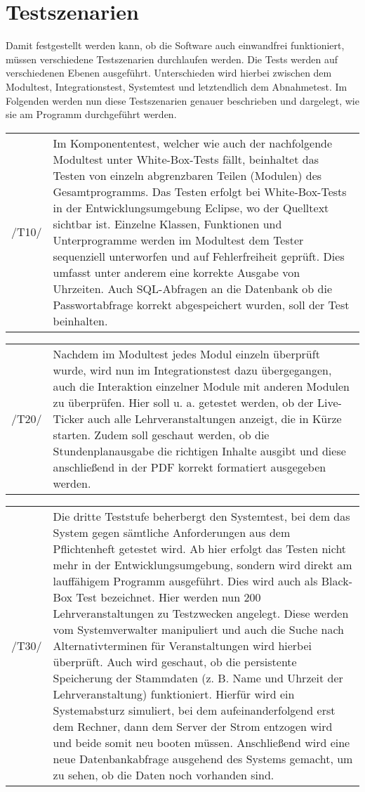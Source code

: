\section{Testszenarien}
\label{sec:Testszenarien}


Damit festgestellt werden kann, ob die Software auch einwandfrei funktioniert, müssen verschiedene Testszenarien durchlaufen werden.
Die Tests werden auf verschiedenen Ebenen ausgeführt. Unterschieden wird hierbei zwischen dem Modultest, Integrationstest, Systemtest und letztendlich dem Abnahmetest.
Im Folgenden werden nun diese Testszenarien genauer beschrieben und dargelegt, wie sie am Programm durchgeführt werden.

\begin{tabular}{p{1.5cm}p{14.5cm}}
 /T10/	& Im Komponententest, welcher wie auch der nachfolgende Modultest unter White-Box-Tests fällt, beinhaltet das Testen von einzeln abgrenzbaren Teilen (Modulen) des Gesamtprogramms. Das Testen erfolgt bei White-Box-Tests in der Entwicklungsumgebung Eclipse, wo der Quelltext sichtbar ist. Einzelne Klassen, Funktionen und Unterprogramme werden im Modultest dem Tester sequenziell unterworfen und auf Fehlerfreiheit geprüft. Dies umfasst unter anderem eine korrekte Ausgabe von Uhrzeiten. Auch SQL-Abfragen an die Datenbank ob die Passwortabfrage korrekt abgespeichert wurden, soll der Test beinhalten. \\[0.25cm]	 
\end{tabular}

\begin{tabular}{p{1.5cm}p{14.5cm}}
 /T20/	& Nachdem im Modultest jedes Modul einzeln überprüft wurde, wird nun im Integrationstest dazu übergegangen, auch die Interaktion einzelner Module mit anderen Modulen zu überprüfen.
Hier soll u. a. getestet werden, ob der Live-Ticker auch alle Lehrveranstaltungen anzeigt, die in Kürze starten. Zudem soll geschaut werden, ob die Stundenplanausgabe die richtigen Inhalte ausgibt und diese anschließend in der PDF korrekt formatiert ausgegeben werden. \\[0.25cm]	 
\end{tabular}

\begin{tabular}{p{1.5cm}p{14.5cm}}
 /T30/	& Die dritte Teststufe beherbergt den Systemtest, bei dem das System gegen sämtliche Anforderungen aus dem Pflichtenheft getestet wird. Ab hier erfolgt das Testen nicht mehr in der Entwicklungsumgebung, sondern wird direkt am lauffähigem Programm ausgeführt. Dies wird auch als Black-Box Test bezeichnet.
Hier werden nun 200 Lehrveranstaltungen zu Testzwecken angelegt. Diese werden vom Systemverwalter manipuliert und auch die Suche nach Alternativterminen für Veranstaltungen wird hierbei überprüft. Auch wird geschaut, ob die persistente Speicherung der Stammdaten
(z. B. Name und Uhrzeit der Lehrveranstaltung) funktioniert. Hierfür wird ein Systemabsturz simuliert, bei dem aufeinanderfolgend erst dem Rechner, dann dem Server der Strom entzogen wird und beide somit neu booten müssen. Anschließend wird eine neue Datenbankabfrage ausgehend des Systems gemacht, um zu sehen, ob die Daten noch vorhanden sind. \\[0.25cm]	 
\end{tabular}

